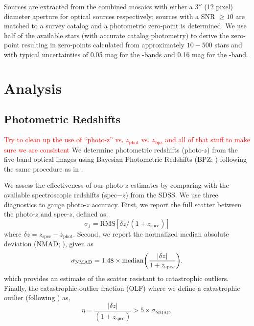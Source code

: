 \documentclass[apj, revtex4-1]{emulateapj}
\newcommand{\editorial}[1]{\textcolor{red}{#1}}
\begin{document}
Sources are extracted from the combined mosaics with either a $3''$ (12 pixel) diameter aperture for optical sources respectively; sources with a SNR $\ge10$ are matched to a survey catalog and a photometric zero-point is determined. We use half of the available stars (with accurate catalog photometry) to derive the zero-point resulting in zero-points calculated from approximately $10-500$ stars and with typical uncertainties of 0.05 mag for the \sdssg\sdssr\sdssi-bands and 0.16 mag for the \sdssz-band.

\section{Analysis}\label{sec:analysis}
\subsection{Photometric Redshifts}
\editorial{Try to clean up the use of ``photo-z'' vs. $z_\mathrm{phot}$ vs. $z_\mathrm{bpz}$ and all of that stuff to make sure we are consistent}
We determine photometric redshifts (photo-$z$) from the five-band optical images using Bayesian Photometric Redshifts (BPZ; \citealt{Benitez2000, Coe2006}) following the same procedure as in \cite{Menanteau2009a}.

We assess the effectiveness of our photo-$z$ estimates by comparing with the available spectroscopic redshifts (spec$-z$) from the SDSS. We use three diagnostics to gauge photo-$z$ accuracy. First, we report the full scatter between the photo-$z$ and spec-$z$, defined as:
\begin{equation}\label{eqn:scatter}
	\sigma_f = \mathrm{RMS}[\delta z/(1+z_\mathrm{spec})]
\end{equation}
where $\delta z = z_\mathrm{spec} - z_\mathrm{phot}$. Second, we report the normalized median absolute deviation (NMAD; \citealt{Ilbert2009, Dahlen2013, Molino2017}), given as
\begin{equation}\label{eqn:nmad}
	\sigma_\mathrm{NMAD} = 1.48 \times \mathrm{median} \bigg{(} \frac{|\delta z|}{1+z_\mathrm{spec}} \bigg{)}.
\end{equation}
which provides an estimate of the scatter resistant to catastrophic outliers. Finally, the catastrophic outlier fraction (OLF) where we define a catastrophic outlier (following \citealt{Molino2017}) as,
\begin{equation}\label{eqn:OLF}
	\eta = \frac{|\delta z|}{(1+z_\mathrm{spec})} > 5 \times \sigma_\mathrm{NMAD}.
\end{equation}
\end{document}
